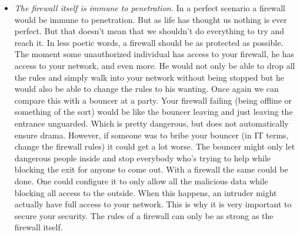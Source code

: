 \begin{itemize}
\item \textit{The firewall itself is immune to penetration.} In a perfect scenario a firewall would be immune to penetration. But as life has thought us nothing is ever perfect. But that doesn't mean that we shouldn't do everything to try and reach it. In less poetic words, a firewall should be as protected as possible. The moment some unauthorized individual has access to your firewall, he has access to your network, and even more. He would not only be able to drop all the rules and simply walk into your network without being stopped but he would also be able to change the rules to his wanting. Once again we can compare this with a bouncer at a party. Your firewall failing (being offline or something of the sort) would be like the bouncer leaving and just leaving the entrance unguarded. Which is pretty dangerous, but does not automatically ensure drama. However, if someone was to bribe your bouncer (in IT terms, change the firewall rules) it could get a lot worse. The bouncer might only let dangerous people inside and stop everybody who's trying to help while blocking the exit for anyone to come out. With a firewall the same could be done. One could configure it to only allow all the malicious data while blocking all access to the outside. When this happens, an intruder might actually have full access to your network. This is why it is very important to secure your security. The rules of a firewall can only be as strong as the firewall itself.
\end{itemize}
